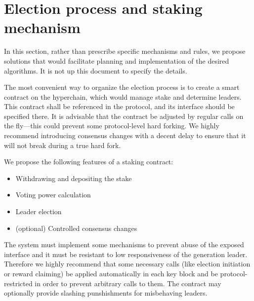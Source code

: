 \section{Election process and staking mechanism}

In this section, rather than prescribe specific mechanisms and rules, we propose
solutions that would facilitate planning and implementation of the desired
algorithms. It is not up this document to specify the details.

The most convenient way to organize the election process is to create a smart
contract on the hyperchain, which would manage stake and determine leaders. This
contract shall be referenced in the protocol, and its interface should be
specified there. It is advisable that the contract be adjusted by regular calls
on the fly---this could prevent some protocol-level hard forking. We highly
recommend introducing consensus changes with a decent delay to ensure that it
will not break during a true hard fork.

We propose the following features of a staking contract:

\begin{itemize}
\item Withdrawing and depositing the stake
\item Voting power calculation
\item Leader election
\item (optional) Controlled consensus changes
\end{itemize}

The system must implement some mechanisms to prevent abuse of the exposed
interface and it must be resistant to low responsiveness of the generation
leader. Therefore we highly recommend that some necessary calls (like election
initiation or reward claiming) be applied automatically in each key block and be
protocol-restricted in order to prevent arbitrary calls to them. The contract
may optionally provide slashing punshishments for misbehaving leaders.
